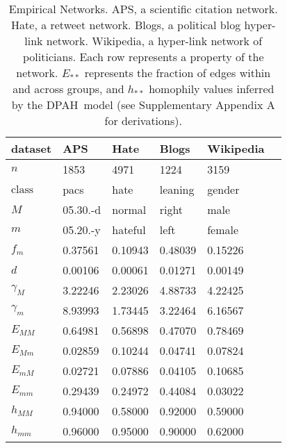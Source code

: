 \documentclass[fleqn,10pt]{wlscirep}
\begin{document}
\begin{table}[ht]
\caption{Empirical Networks. APS, a scientific citation network. Hate, a retweet network. Blogs, a political blog hyper-link network. Wikipedia, a hyper-link network of politicians. Each row represents a property of the network. $E_{**}$ represents the fraction of edges within and across groups, and $h_{**}$ homophily values inferred by the {DPAH}~model (see Supplementary Appendix A for derivations).}
\label{tbl:empirical}
\centering
\begin{tabular}{llllll}
\toprule
dataset &          APS &     Hate   &  Blogs   & Wikipedia \\
\midrule
$n$     &         1853 &     4971    &   1224  & 3159   \\
$\text{class}$ &  pacs &     hate    & leaning & gender \\
$M$        &  05.30.-d &     normal  &  right  & male    \\
$m$        &  05.20.-y &     hateful &  left   & female  \\
$f_m$      &   0.37561 &     0.10943 & 0.48039 & 0.15226 \\
$d$        &   0.00106 &     0.00061 & 0.01271 & 0.00149 \\
$\gamma_M$ &   3.22246 &     2.23026 & 4.88733 & 4.22425 \\
$\gamma_m$ &   8.93993 &     1.73445 & 3.22464 & 6.16567 \\
$E_{MM}$   &   0.64981 &     0.56898 & 0.47070 & 0.78469 \\
$E_{Mm}$   &   0.02859 &     0.10244 & 0.04741 & 0.07824 \\
$E_{mM}$   &   0.02721 &     0.07886 & 0.04105 & 0.10685 \\
$E_{mm}$   &   0.29439 &     0.24972 & 0.44084 & 0.03022 \\
$h_{MM}$   &   0.94000 &     0.58000 & 0.92000 & 0.59000 \\
$h_{mm}$   &   0.96000 &     0.95000 & 0.90000 & 0.62000 \\
\bottomrule
\end{tabular}
\end{table}
\end{document}
